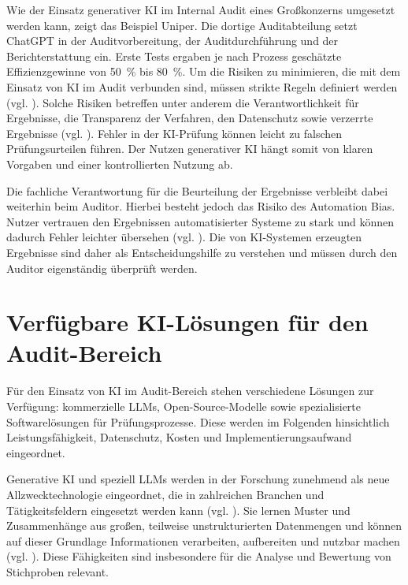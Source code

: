Wie der Einsatz generativer \ac{KI} im Internal Audit eines Großkonzerns umgesetzt werden kann, zeigt das Beispiel Uniper. Die dortige Auditabteilung setzt ChatGPT in der Auditvorbereitung, der Auditdurchführung und der Berichterstattung ein. Erste Tests ergaben je nach Prozess geschätzte Effizienzgewinne von 50~\% bis 80~\%. Um die Risiken zu minimieren, die mit dem Einsatz von \ac{KI} im Audit verbunden sind, müssen strikte Regeln definiert werden (vgl. \cite[S.~125\,ff.]{emett2025leveraging}). Solche Risiken betreffen unter anderem die Verantwortlichkeit für Ergebnisse, die Transparenz der Verfahren, den Datenschutz sowie verzerrte Ergebnisse (vgl. \cite[S. 13]{munoko2020ethical}). Fehler in der \ac{KI}-Prüfung können leicht zu falschen Prüfungsurteilen führen. Der Nutzen generativer \ac{KI} hängt somit von klaren Vorgaben und einer kontrollierten Nutzung ab.

Die fachliche Verantwortung für die Beurteilung der Ergebnisse verbleibt dabei weiterhin beim Auditor. Hierbei besteht jedoch das Risiko des Automation Bias. Nutzer vertrauen den Ergebnissen automatisierter Systeme zu stark und können dadurch Fehler leichter übersehen (vgl. \cite[S.~425\,f.]{lyell2017automation}). Die von \ac{KI}-Systemen erzeugten Ergebnisse sind daher als Entscheidungshilfe zu verstehen und müssen durch den Auditor eigenständig überprüft werden.


\section{Verfügbare KI-Lösungen für den Audit-Bereich}
\label{sec:ki_loesungen}

Für den Einsatz von \ac{KI} im Audit-Bereich stehen verschiedene Lösungen zur Verfügung: kommerzielle \acp{LLM}, Open-Source-Modelle sowie spezialisierte Softwarelösungen für Prüfungsprozesse. Diese werden im Folgenden hinsichtlich Leistungsfähigkeit, Datenschutz, Kosten und Implementierungsaufwand eingeordnet.

Generative \ac{KI} und speziell \acp{LLM} werden in der Forschung zunehmend als neue Allzwecktechnologie eingeordnet, die in zahlreichen Branchen und Tätigkeitsfeldern eingesetzt werden kann (vgl. \cite[S.~44]{calvino2025generative}). Sie lernen Muster und Zusammenhänge aus großen, teilweise unstrukturierten Datenmengen und können auf dieser Grundlage Informationen verarbeiten, aufbereiten und nutzbar machen (vgl. \cite[S.~112]{Feuerriegel2024GenerativeAI}). Diese Fähigkeiten sind insbesondere für die Analyse und Bewertung von Stichproben relevant.

